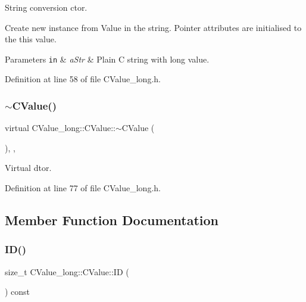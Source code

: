 String conversion c\textquotesingle{}tor. 

Create new instance from Value in the string. Pointer attributes are initialised to the {\ttfamily this} value. 
\begin{DoxyParams}[1]{Parameters}
\mbox{\tt in}  & {\em a\+Str} & Plain C string with long value. \\
\hline
\end{DoxyParams}


Definition at line 58 of file C\+Value\+\_\+long.\+h.

\mbox{\label{class_c_value__long_1_1_c_value_aedefeae635e586789cd62bd9ec5401de}} 
\subsubsection{\texorpdfstring{$\sim$\+C\+Value()}{~CValue()}}
{\footnotesize\ttfamily virtual C\+Value\+\_\+long\+::\+C\+Value\+::$\sim$\+C\+Value (\begin{DoxyParamCaption}{ }\end{DoxyParamCaption})\hspace{0.3cm}{\ttfamily [inline]}, {\ttfamily [virtual]}, {\ttfamily [noexcept]}}



Virtual d\textquotesingle{}tor. 



Definition at line 77 of file C\+Value\+\_\+long.\+h.



\subsection{Member Function Documentation}
\mbox{\label{class_c_value__long_1_1_c_value_aa7ef0a671a39efbc567fa9c6a1fb49a8}} 
\subsubsection{\texorpdfstring{I\+D()}{ID()}}
{\footnotesize\ttfamily size\+\_\+t C\+Value\+\_\+long\+::\+C\+Value\+::\+ID (\begin{DoxyParamCaption}{ }\end{DoxyParamCaption}) const\hspace{0.3cm}{\ttfamily [inline]}}



